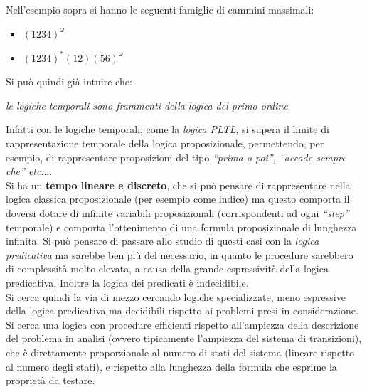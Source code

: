 \documentclass[a4paper,12pt, oneside]{book}
\begin{document}
\begin{esempio}
  Nell'esempio sopra si hanno le seguenti famiglie di cammini massimali:
  \begin{itemize}
    \item $(1234)^\omega$
    \item $(1234)^{*}(12)(56)^\omega$
  \end{itemize}
\end{esempio}
Si può quindi già intuire che:
\begin{center}
  \textit{le logiche temporali sono frammenti della logica del primo ordine}
\end{center}
Infatti con le logiche temporali, come la \textit{logica PLTL}, si supera il
limite di rappresentazione temporale della logica proposizionale, permettendo,
per esempio, di rappresentare proposizioni del tipo \textit{``prima o poi'',
  ``accade sempre che'' etc$\ldots$}.\\
Si ha un \textbf{tempo lineare e discreto}, che si può pensare di rappresentare
nella logica classica proposizionale (per esempio come indice) ma questo
comporta il doversi dotare di infinite variabili proposizionali (corrispondenti
ad ogni \textit{``step''} temporale) e comporta l'ottenimento di una formula
proposizionale di lunghezza infinita. Si può pensare di passare allo studio di
questi casi con la \textit{logica predicativa} ma sarebbe ben più del
necessario, in quanto le procedure sarebbero di complessità molto elevata, a
causa della grande espressività della logica predicativa. Inoltre la logica dei
predicati è indecidibile. \\
Si cerca quindi la via di mezzo cercando logiche specializzate, meno espressive
della logica predicativa ma decidibili rispetto ai problemi presi in
considerazione. Si cerca una logica con procedure efficienti rispetto
all'ampiezza della descrizione del problema in analisi (ovvero tipicamente
l'ampiezza del sistema di transizioni), che è direttamente proporzionale al
numero di stati del sistema (lineare rispetto al numero degli stati), e rispetto
alla lunghezza della formula che esprime la proprietà da testare.
\end{document}

